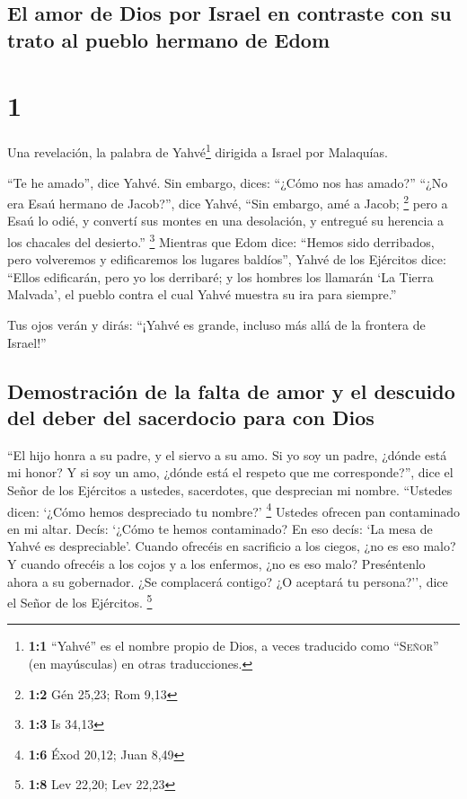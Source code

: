 \hypertarget{el-amor-de-dios-por-israel-en-contraste-con-su-trato-al-pueblo-hermano-de-edom}{%
\subsection{El amor de Dios por Israel en contraste con su trato al
pueblo hermano de
Edom}\label{el-amor-de-dios-por-israel-en-contraste-con-su-trato-al-pueblo-hermano-de-edom}}

\hypertarget{section}{%
\section{1}\label{section}}

 Una revelación, la palabra de Yahvé\footnote{\textbf{1:1}
  ``Yahvé'' es el nombre propio de Dios, a veces traducido como
  ``\textsc{Señor}'' (en mayúsculas) en otras traducciones.} dirigida a
Israel por Malaquías.

 ``Te he amado'', dice Yahvé. Sin embargo, dices: ``¿Cómo
nos has amado?'' ``¿No era Esaú hermano de Jacob?'', dice Yahvé, ``Sin
embargo, amé a Jacob; \footnote{\textbf{1:2} Gén 25,23; Rom 9,13}
 pero a Esaú lo odié, y convertí sus montes en una
desolación, y entregué su herencia a los chacales del desierto.''
\footnote{\textbf{1:3} Is 34,13}  Mientras que Edom dice:
``Hemos sido derribados, pero volveremos y edificaremos los lugares
baldíos'', Yahvé de los Ejércitos dice: ``Ellos edificarán, pero yo los
derribaré; y los hombres los llamarán `La Tierra Malvada', el pueblo
contra el cual Yahvé muestra su ira para siempre.''

 Tus ojos verán y dirás: ``¡Yahvé es grande, incluso más
allá de la frontera de Israel!''

\hypertarget{demostraciuxf3n-de-la-falta-de-amor-y-el-descuido-del-deber-del-sacerdocio-para-con-dios}{%
\subsection{Demostración de la falta de amor y el descuido del deber del
sacerdocio para con
Dios}\label{demostraciuxf3n-de-la-falta-de-amor-y-el-descuido-del-deber-del-sacerdocio-para-con-dios}}

 ``El hijo honra a su padre, y el siervo a su amo. Si yo
soy un padre, ¿dónde está mi honor? Y si soy un amo, ¿dónde está el
respeto que me corresponde?'', dice el Señor de los Ejércitos a ustedes,
sacerdotes, que desprecian mi nombre. ``Ustedes dicen: `¿Cómo hemos
despreciado tu nombre?' \footnote{\textbf{1:6} Éxod 20,12; Juan 8,49}
 Ustedes ofrecen pan contaminado en mi altar. Decís:
`¿Cómo te hemos contaminado? En eso decís: `La mesa de Yahvé es
despreciable'.  Cuando ofrecéis en sacrificio a los
ciegos, ¿no es eso malo? Y cuando ofrecéis a los cojos y a los enfermos,
¿no es eso malo? Preséntenlo ahora a su gobernador. ¿Se complacerá
contigo? ¿O aceptará tu persona?'', dice el Señor de los Ejércitos.
\footnote{\textbf{1:8} Lev 22,20; Lev 22,23}

